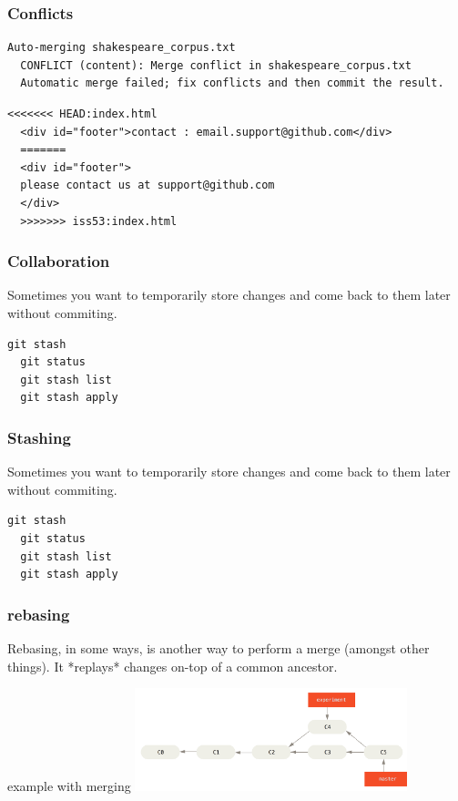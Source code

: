 \documentclass{beamer}
\begin{document}
\begin{frame}[fragile]
  \frametitle{Conflicts}

  \begin{lstlisting}[caption=possible result of a merge] 
  Auto-merging shakespeare_corpus.txt
  CONFLICT (content): Merge conflict in shakespeare_corpus.txt
  Automatic merge failed; fix conflicts and then commit the result.
  \end{lstlisting}

 \begin{lstlisting}[caption=a conflict] 
  <<<<<<< HEAD:index.html
  <div id="footer">contact : email.support@github.com</div>
  =======
  <div id="footer">
  please contact us at support@github.com
  </div>
  >>>>>>> iss53:index.html
 \end{lstlisting}

\end{frame}


\begin{frame}[fragile]
  \frametitle{Collaboration}
  Sometimes you want to temporarily store changes and come back to them later without commiting.

  \begin{lstlisting}[caption=stashing] 
  git stash
  git status
  git stash list
  git stash apply
  \end{lstlisting}

\end{frame}






\begin{frame}[fragile]
  \frametitle{Stashing}
  Sometimes you want to temporarily store changes and come back to them later without commiting.

  \begin{lstlisting}[caption=stashing] 
  git stash
  git status
  git stash list
  git stash apply
  \end{lstlisting}

\end{frame}


\begin{frame}
  \frametitle{rebasing}
    Rebasing, in some ways, is another way to perform a merge (amongst other things). It *replays* changes on-top of a common ancestor.

  \begin{block}{example with merging}
    \includegraphics[height=3cm]{basic-rebase-2.png}
  \end{block}

\end{frame}
\end{document}
